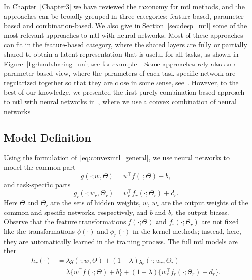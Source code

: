 %
In Chapter~\ref{Chapter3} we have reviewed the taxonomy for \acrshort{mtl} methods, and the approaches can be broadly grouped in three categories: feature-based, parameter-based and combination-based. 
We also give in Section~\ref{sec:deep_mtl} some of the most relevant approaches to \acrshort{mtl} with neural networks. Most of these approaches can fit in the feature-based category, where the shared layers are fully or partially shared to obtain a latent representation that is useful for all tasks, as shown in Figure~\ref{fig:hardsharing_nn}; see for example~\cite{Caruana97, MisraSGH16,RuderBAS17}. Some approaches rely also on a parameter-based view, where the parameters of each task-specific network are regularized together so that they are close in some sense, see~\cite{Long015a, YangH17a}.
However, to the best of our knowledge, we presented the first purely combination-based approach to \acrshort{mtl} with neural networks in~\cite{RuizAD22_hais}, where we use a convex combination of neural networks.



\subsection{Model Definition}
Using the formulation of~\eqref{eq:convexmtl_general}, we use neural networks to model the common part 
$$ g(\cdot; w, \Theta) = w^\intercal f(\cdot; \Theta) + b,$$
and task-specific parts
$$ g_r(\cdot; w_r, \Theta_r) =  w_r^\intercal f_r(\cdot; \Theta_r) + d_r.$$
Here $\Theta$ and $\Theta_r$ are the sets of hidden weights, $w$, $w_r$ are the output weights of the common and specific networks, respectively, and $b$ and $b_r$ the output biases.
Observe that the feature transformations $ f(\cdot; \Theta)$ and $f_r(\cdot; \Theta_r)$ are not fixed like the transformations $\phi(\cdot)$ and $\phi_r(\cdot)$ in the kernel methods; instead, here, they are automatically learned in the training process.
The full \acrshort{mtl} models are then
\begin{equation}
    \label{eq:convexmtl_nn}
    \begin{aligned}
        h_r(\cdot) &= \lambda g(\cdot; w, \Theta) + (1 - \lambda) g_r(\cdot; w_r, \Theta_r)
       \\&= \lambda \lbrace w^\intercal f(\cdot; \Theta) + b \rbrace + (1 - \lambda) \lbrace w_r^\intercal f_r(\cdot; \Theta_r) + d_r \rbrace.
    \end{aligned}    
\end{equation}

